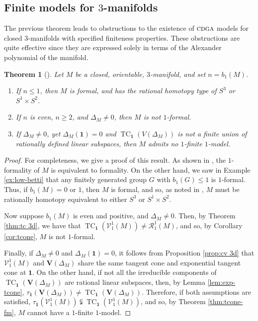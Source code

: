 \documentclass{article}
\numberwithin{equation}{section}
\newtheorem{theorem}{Theorem}[section]
\theoremstyle{definition}
\newcommand{\VV}{\mathcal{V}}
\newcommand{\RR}{\mathcal{R}}
\newcommand{\cdga}{\ensuremath{\textsc{cdga}}}
\DeclareMathOperator{\TC}{TC}
\newcommand{\one}{\mathbf{1}}
\begin{document}
\subsection{Finite models for $3$-manifolds}
\label{subsec:models 3-mfd}

The previous theorem leads to obstructions to the existence of $\cdga$ 
models for closed $3$-manifolds with specified finiteness properties. 
These obstructions are quite effective since they are expressed 
solely in terms of the Alexander polynomial of the manifold.

\begin{theorem}[\cite{Su-mm}]
\label{thm:even betti1}
Let $M$ be a closed, orientable, $3$-manifold, and set 
$n=b_1(M)$. 

\begin{enumerate}
\item \label{f1}
If $n\le 1$, then $M$ is formal, and has the rational homotopy type 
of $S^3$ or $S^1\times S^2$. 
\item \label{f2} 
If $n$ is even, $n\ge 2$, and $\Delta_M\ne 0$, then 
$M$ is not $1$-formal. 
\item \label{f3} 
If $\Delta_M\ne 0$, yet $\Delta_M(\one) =0$  and $\TC_{\one}(V(\Delta_M))$ 
is not a finite union of rationally defined linear subspaces, then $M$ 
admits no $1$-finite $1$-model. 
\end{enumerate}
\end{theorem}

\begin{proof}
For completeness, we give a proof of this result. As shown in \cite{FM05}, 
the $1$-formality of $M$ is equivalent to formality. On the other hand, we saw in 
Example \ref{ex:low-betti} that any finitely generated group $G$ 
with $b_1(G)\le 1$ is $1$-formal. Thus, if 
$b_1(M)=0$ or $1$, then $M$ is formal, and so, as noted in \cite{PS-formal}, $M$ 
must be rationally homotopy equivalent to either $S^3$ or $S^1\times S^2$. 

Now suppose $b_1(M)$ is even and positive, and $\Delta_M\ne 0$. 
Then, by Theorem \ref{thm:tc 3d}, we have that 
$\TC_{\one}(\VV^1_1(M))\ne  \RR^1_1(M)$, and so, by 
Corollary \ref{cor:tcone}, $M$ is not $1$-formal. 

Finally, if $\Delta_M\ne 0$ and $\Delta_M(\one) =0$, 
it follows from Proposition \ref{prop:cv 3d} that 
$\VV^1_1(M)$ and $\mathbf{V}(\Delta_M)$ share the 
same tangent cone and exponential tangent cone at $\one$. 
On the other hand, if not all the irreducible components of 
$\TC_{\one}(\mathbf{V}(\Delta_M))$ are rational linear subspaces,  
then, by Lemma \ref{lem:exp-tcone}, 
$\tau_{\one}(\mathbf{V}(\Delta_M))\ne \TC_{\one}(\mathbf{V}(\Delta_M))$. 
Therefore, if both assumptions are satisfied, 
$\tau_{\one}(\VV^1_1(M))\subsetneqq \TC_{\one}(\VV^1_1(M))$, 
and so, by Theorem \ref{thm:tcone-fm}, 
$M$ cannot have a $1$-finite $1$-model. 
\end{proof}
\end{document}
